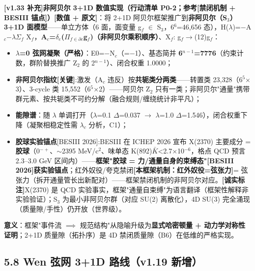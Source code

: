 \documentclass[12pt]{article}
\newcommand{\mtag}[1]{\textbf{[#1]}}
\newcommand{\up}[1]{\ensuremath{^{#1}}}
\newcommand{\down}[1]{\ensuremath{_{#1}}}
\begin{document}
\textbf{\mtag{v1.33 补充}非阿贝尔 3+1D 数值实现（行动清单 P0-2；参考\mtag{禁闭机制 + BESIII 锚点}）}\mtag{数值 + 原文}：将 2+1D 阿贝尔框架推广到\textbf{非阿贝尔（S\down{3}）3+1D 面模型}------单立方体（6 面，面变量 g\down{f} \ensuremath{\in} S\down{3}，6\up{6}=46,656 态），H(\ensuremath{\lambda})=\ensuremath{-}A\down{c}\ensuremath{-}\ensuremath{\lambda}\ensuremath{\Sigma}\down{f} X\down{f}，\textbf{A\down{c}=\ensuremath{\delta}\down{e}(\ensuremath{\Pi}\down{f\in{}\partial{}c}g\down{f})（非阿贝尔乘积顺序）}、X\down{f}: g\down{f}\ensuremath{\to}(12)g\down{f}：
\begin{itemize}
\item \textbf{\ensuremath{\lambda}=0 弦网凝聚（严格）}：E0=\ensuremath{-}N\down{c}（=\ensuremath{-}1）、基态简并 \textbf{6\up{n-1}=7776}（约束计数，群阶替换推广 Z\down{2} 的 2\up{n-1}）、闭合权重 1.0000；
\item \textbf{非阿贝尔指纹\mtag{关键}}:激发（A\down{c} 违反）按\textbf{共轭类分两类}------转置类 23,328（6\up{5}\ensuremath{\times}3）、3-cycle 类 15,552（6\up{5}\ensuremath{\times}2）------阿贝尔 Z\down{2} 只有一类；非阿贝尔"通量"携带群元素、按共轭类不可约分解（融合规则/缠绕统计非平凡）；
\item \textbf{能隙谱}：随 \ensuremath{\lambda} 单调打开（\ensuremath{\lambda}=0.1 \ensuremath{\Delta}=0.037 \ensuremath{\to} \ensuremath{\lambda}=1.0 \ensuremath{\Delta}=1.546），闭合权重下降（凝聚相稳定性需 \ensuremath{\lambda}\down{c} 分析，C1）；
\item \textbf{胶球实验锚点}[BESIII 2026]:BESIII 在 ICHEP 2026 宣布 X(2370) 主要成分 = \textbf{胶球}（0\up{-+}、\ensuremath{\sim}2395 MeV/c\up{2}、味单态 K(892)\ensuremath{\bar{K}}<2.7\ensuremath{\times}10\up{-6}，格点 QCD 预言 2.3--3.0 GeV 区间内）------\textbf{框架"胶球 = 力/通量自身的束缚态"[BESIII 2026]获实验锚点}；红外奴役/夸克禁闭\mtag{本框架机制：红外奴役=弦张力}= 弦张力（拆开通量管长出新配对）------框架禁闭机制的非阿贝尔对应。\mtag{诚实标注}X(2370) 是 QCD 实验事实，框架"通量自束缚"为语言翻译（框架性解释非实验验证）；S\down{3} 为最小非阿贝尔群（对应 SU(2) 离散化），4D SU(3) 完全涌现（质量隙/手性）仍开放（世界级）。
\end{itemize}

\textbf{意义}：框架"事件流 \ensuremath{\implies} 规范结构"从隐喻升级为\textbf{显式哈密顿量 + 动力学对称性证明}；2+1D 质量隙（拓扑序）是 4D 禁闭质量隙（B6）在低维的严格实现。

\subsection{5.8 Wen 弦网 3+1D 路线（v1.19 新增）}
\end{document}
